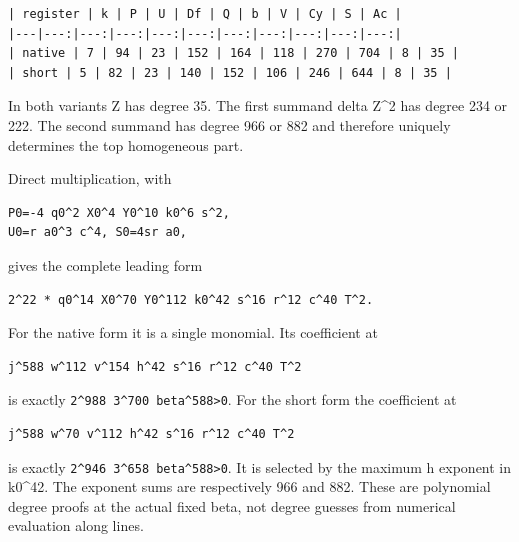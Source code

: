\begin{verbatim}
| register | k | P | U | Df | Q | b | V | Cy | S | Ac |
|---|---:|---:|---:|---:|---:|---:|---:|---:|---:|---:|
| native | 7 | 94 | 23 | 152 | 164 | 118 | 270 | 704 | 8 | 35 |
| short | 5 | 82 | 23 | 140 | 152 | 106 | 246 | 644 | 8 | 35 |
\end{verbatim}

In both variants Z has degree 35. The first summand delta Z\textasciicircum{}\allowbreak{}2 has degree 234 or 222. The second summand has degree 966 or 882 and therefore uniquely determines the top homogeneous part.



Direct multiplication, with



\begin{verbatim}
P0=-4 q0^2 X0^4 Y0^10 k0^6 s^2,
U0=r a0^3 c^4, S0=4sr a0,
\end{verbatim}

gives the complete leading form



\begin{verbatim}
2^22 * q0^14 X0^70 Y0^112 k0^42 s^16 r^12 c^40 T^2.
\end{verbatim}

For the native form it is a single monomial. Its coefficient at



\begin{verbatim}
j^588 w^112 v^154 h^42 s^16 r^12 c^40 T^2
\end{verbatim}

is exactly \texttt{2\textasciicircum{}\allowbreak{}988 \textasteriskcentered{}\allowbreak{} 3\textasciicircum{}\allowbreak{}700 \textasteriskcentered{}\allowbreak{} beta\textasciicircum{}\allowbreak{}588\textgreater{}\allowbreak{}0}. For the short form the coefficient at



\begin{verbatim}
j^588 w^70 v^112 h^42 s^16 r^12 c^40 T^2
\end{verbatim}

is exactly \texttt{2\textasciicircum{}\allowbreak{}946 \textasteriskcentered{}\allowbreak{} 3\textasciicircum{}\allowbreak{}658 \textasteriskcentered{}\allowbreak{} beta\textasciicircum{}\allowbreak{}588\textgreater{}\allowbreak{}0}. It is selected by the maximum h exponent in k0\textasciicircum{}\allowbreak{}42. The exponent sums are respectively 966 and 882. These are polynomial degree proofs at the actual fixed beta, not degree guesses from numerical evaluation along lines.



